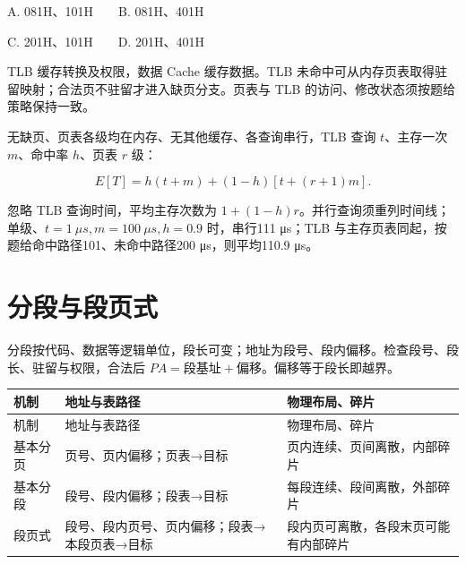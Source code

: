 A. 081H、101H　　B. 081H、401H

C. 201H、101H　　D. 201H、401H

TLB 缓存转换及权限，数据 Cache 缓存数据。TLB 未命中可从内存页表取得驻留映射；合法页不驻留才进入缺页分支。页表与 TLB 的访问、修改状态须按题给策略保持一致。

无缺页、页表各级均在内存、无其他缓存、各查询串行，TLB 查询 \(t\)、主存一次 \(m\)、命中率 \(h\)、页表 \(r\) 级：

\[E[T]=h(t+m)+(1-h)[t+(r+1)m].\]

忽略 TLB 查询时间，平均主存次数为 \(1+(1-h)r\)。并行查询须重列时间线；单级、\(t=1\ \mu s,m=100\ \mu s,h=0.9\) 时，串行111 μs；TLB 与主存页表同起，按题给命中路径101、未命中路径200 μs，则平均110.9 μs。

\section{分段与段页式}\label{OS03-segmentation}

分段按代码、数据等逻辑单位，段长可变；地址为段号、段内偏移。检查段号、段长、驻留与权限，合法后 \(PA=\text{段基址}+\text{偏移}\)。偏移等于段长即越界。

\par\smallskip
\begin{wideblock}
{\fontsize{9.3}{12}\selectfont\setlength{\tabcolsep}{2.5pt}\setlength{\LTleft}{0pt}\setlength{\LTright}{0pt}
\begin{longtable}{@{}>{\raggedright\arraybackslash}p{}>{\raggedright\arraybackslash}p{}>{\raggedright\arraybackslash}p{}@{}}
\toprule
机制 & 地址与表路径 & 物理布局、碎片 \\

\midrule\endfirsthead\toprule
机制 & 地址与表路径 & 物理布局、碎片 \\

\midrule\endhead\bottomrule\endfoot
基本分页 & 页号、页内偏移；页表→目标 & 页内连续、页间离散，内部碎片 \\

基本分段 & 段号、段内偏移；段表→目标 & 每段连续、段间离散，外部碎片 \\

段页式 & 段号、段内页号、页内偏移；段表→本段页表→目标 & 段内页可离散，各段末页可能有内部碎片 \\

\end{longtable}}
\end{wideblock}
\par\smallskip

